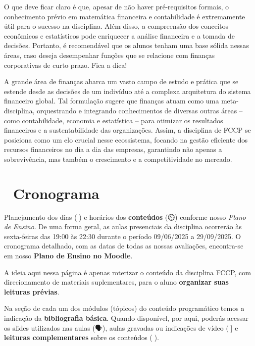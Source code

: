 \documentclass[
  a4paper,
]{book}
\begin{document}
O que deve ficar claro é que, apesar de não haver pré-requisitos
formais, o conhecimento prévio em matemática financeira e contabilidade
é extremamente útil para o sucesso na disciplina. Além disso, a
compreensão dos conceitos econômicos e estatísticos pode enriquecer a
análise financeira e a tomada de decisões. Portanto, é recomendável que
os alunos tenham uma base sólida nessas áreas, caso deseja desempenhar
funções que se relacione com finanças corporativas de curto prazo. Fica
a dica!

A grande área de finanças abarca um vasto campo de estudo e prática que
se estende desde as decisões de um indivíduo até a complexa arquitetura
do sistema financeiro global. Tal formulação sugere que finanças atuam
como uma meta-disciplina, orquestrando e integrando conhecimentos de
diversas outras áreas -- como contabilidade, economia e estatística --
para otimizar os resultados financeiros e a sustentabilidade das
organizações. Assim, a disciplina de FCCP se posiciona como um elo
crucial nesse ecossistema, focando na gestão eficiente dos recursos
financeiros no dia a dia das empresas, garantindo não apenas a
sobrevivência, mas também o crescimento e a competitividade no mercado.


\chapter*{📅 Cronograma}\label{sec-schedule}


Planejamento dos dias (📅) e horários dos \textbf{conteúdos} (⏲️)
conforme nosso \emph{Plano de Ensino}. De uma forma geral, as aulas
presenciais da disciplina ocorrerão às sexta-feiras das 19:00 às 22:30
durante o período 09/06/2025 a 29/09/2025. O cronograma detalhado, com
as datas de todas as nossas avaliações, encontra-se em nosso
\textbf{Plano de Ensino no Moodle}.

A ideia aqui nessa página é apenas roterizar o conteúdo da disciplina
FCCP, com direcionamento de materiais suplementares, para o aluno
\textbf{organizar suas leituras prévias}.

Na seção de cada um dos módulos (tópicos) do conteúdo programático temos
a indicação da \textbf{bibliografia básica}. Quando disponível, por
aqui, poderás acessar os slides utilizados nas aulas (🗣️), aulas
gravadas ou indicações de vídeo (🎥{]} e \textbf{leituras
complementares} sobre os conteúdos (📓).
\end{document}
